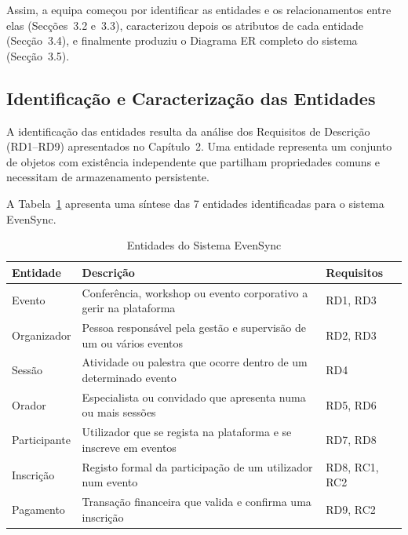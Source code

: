 \documentclass[runningheads]{llncs}
\begin{document}
                \vspace{0.2cm}

                Assim, a equipa começou por identificar as entidades e os relacionamentos entre elas
                (Secções~3.2 e~3.3), caracterizou depois os atributos de cada entidade (Secção~3.4),
                e finalmente produziu o Diagrama ER completo do sistema (Secção~3.5).


                \subsection{Identificação e Caracterização das Entidades}

                A identificação das entidades resulta da análise dos Requisitos de Descrição (RD1--RD9)
                apresentados no Capítulo~2. Uma entidade representa um conjunto de objetos com existência
                independente que partilham propriedades comuns e necessitam de armazenamento persistente.

                \vspace{0.2cm}

                A Tabela~\ref{tab:entidades} apresenta uma síntese das 7 entidades identificadas para
                o sistema EvenSync.

                \begin{table}[H]
                \centering
                \begin{tabular}{|p{}|p{}|p{}|}
                \hline
                \textbf{Entidade} & \textbf{Descrição} & \textbf{Requisitos} \\ \hline
                Evento       & Conferência, workshop ou evento corporativo a gerir na plataforma & RD1, RD3 \\ \hline
                Organizador  & Pessoa responsável pela gestão e supervisão de um ou vários eventos & RD2, RD3 \\ \hline
                Sessão       & Atividade ou palestra que ocorre dentro de um determinado evento & RD4 \\ \hline
                Orador       & Especialista ou convidado que apresenta numa ou mais sessões & RD5, RD6 \\ \hline
                Participante & Utilizador que se regista na plataforma e se inscreve em eventos & RD7, RD8 \\ \hline
                Inscrição    & Registo formal da participação de um utilizador num evento & RD8, RC1, RC2 \\ \hline
                Pagamento    & Transação financeira que valida e confirma uma inscrição & RD9, RC2 \\ \hline
                \end{tabular}
                \vspace{0.2cm}
                \caption{Entidades do Sistema EvenSync}
                \label{tab:entidades}
                \end{table}
\end{document}
